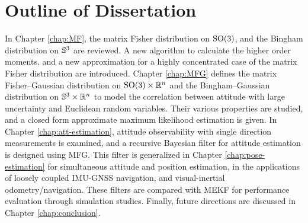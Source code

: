 \section{Outline of Dissertation}

In Chapter \ref{chap:MF}, the matrix Fisher distribution on $\mathrm{SO}(3)$, and the Bingham distribution on $\mathbb{S}^3$ are reviewed.
A new algorithm to calculate the higher order moments, and a new approximation for a highly concentrated case of the matrix Fisher distribution are introduced.
Chapter \ref{chap:MFG} defines the matrix Fisher--Gaussian distribution on $\mathrm{SO}(3) \times \mathbb{R}^n$ and the Bingham--Gaussian distribution on $\mathbb{S}^3\times\mathbb{R}^n$ to model the correlation between attitude with large uncertainty and Euclidean random variables.
Their various properties are studied, and a closed form approximate maximum likelihood estimation is given.
In Chapter \ref{chap:att-estimation}, attitude observability with single direction measurements is examined, and a recursive Bayesian filter for attitude estimation is designed using MFG.
This filter is generalized in Chapter \ref{chap:pose-estimation} for simultaneous attitude and position estimation, in the applications of loosely coupled IMU-GNSS navigation, and visual-inertial odometry/navigation.
These filters are compared with MEKF for performance evaluation through simulation studies.
Finally, future directions are discussed in Chapter \ref{chap:conclusion}.

